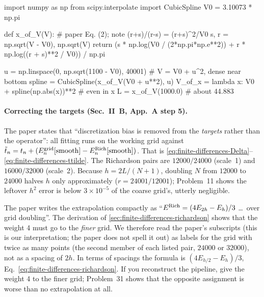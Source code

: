 \begin{pycode}
import numpy as np
from scipy.interpolate import CubicSpline
V0 = 3.10073 * np.pi

def x_of_V(V):                      # paper Eq. (2); note (r+s)/(r-s) = (r+s)^2/V0
    s, r = np.sqrt(V - V0), np.sqrt(V)
    return (s * np.log(V0 / (2*np.pi*np.e**2))
            + r * np.log((r + s)**2 / V0)) / np.pi

u = np.linspace(0, np.sqrt(1100 - V0), 40001)   # V = V0 + u^2, dense near bottom
spline = CubicSpline(x_of_V(V0 + u**2), u)
V_of_x = lambda x: V0 + spline(np.abs(x))**2     # even in x
L = x_of_V(1000.0)                               # about 44.883
\end{pycode}

\paragraph{Correcting the targets (Sec.~II~B, App.~A step 5).} The paper states that ``discretization bias is removed from the \emph{targets} rather than the operator'': all fitting runs on the working grid against $\tilde t_n=t_n+(E^{\rm grid}_n[\mathrm{smooth}]-E^{\rm Rich}_n[\mathrm{smooth}])$. That is \eqref{eq:finite-differences-Delta}--\eqref{eq:finite-differences-ttilde}. The Richardson pairs are $12000/24000$ (scale~1) and $16000/32000$ (scale~2). Because $h=2L/(N+1)$, doubling $N$ from $12000$ to $24000$ halves $h$ only approximately ($r=24001/12001$); Problem~11 shows the leftover $h^2$ error is below $3\times10^{-5}$ of the coarse grid's, utterly negligible.

\begin{pitfall}
The paper writes the extrapolation compactly as ``$E^{\rm Rich}=(4E_{2h}-E_h)/3$ \ldots\ over grid doubling''. The derivation of \cref{sec:finite-differences-richardson} shows that the weight 4 must go to the \emph{finer} grid. We therefore read the paper's subscripts (this is our interpretation; the paper does not spell it out) as labels for the grid with twice as many points (the second member of each listed pair, $24000$ or $32000$), not as a spacing of $2h$. In terms of spacings the formula is $(4E_{h/2}-E_h)/3$, Eq.~\eqref{eq:finite-differences-richardson}. If you reconstruct the pipeline, give the weight 4 to the finer grid; Problem~31 shows that the opposite assignment is worse than no extrapolation at all.
\end{pitfall}

